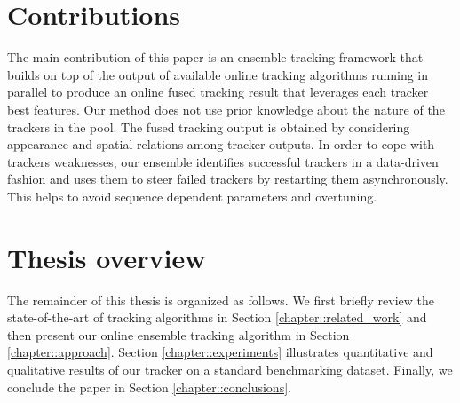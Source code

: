 \section{Contributions}

The main contribution of this paper is an ensemble tracking
framework that builds on top of the output of available online tracking
algorithms running in parallel to produce an online fused tracking result that
leverages each tracker best features. Our method does not use prior knowledge
about the nature of the trackers in the pool.
The fused tracking output is obtained by considering appearance and spatial
relations among tracker outputs.
In order to cope with trackers weaknesses,
our ensemble identifies successful trackers in a data-driven fashion
and uses them to steer failed trackers by restarting them asynchronously.
This helps to avoid sequence dependent parameters and overtuning.

\section{Thesis overview}

The remainder of this thesis is organized as follows.
We first briefly review the state-of-the-art of tracking algorithms
in Section \ref{chapter::related_work} and
then present our online ensemble tracking algorithm
in Section \ref{chapter::approach}.
Section \ref{chapter::experiments} illustrates quantitative and qualitative results of our
tracker on a standard benchmarking dataset.
Finally, we conclude the paper in Section \ref{chapter::conclusions}.